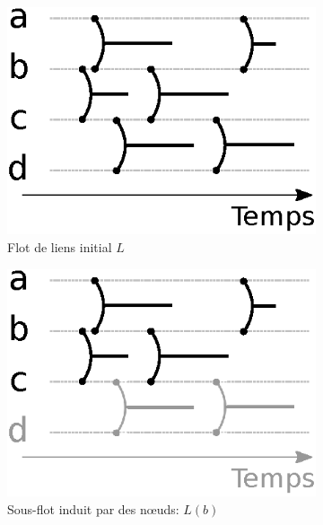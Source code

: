 \begin{figure}[]
\centering
	\begin{subfigure}{0.25\linewidth}
		\includegraphics[width=\linewidth]{img/Intro/sous_flots.eps}\hfill
		\caption{Flot de liens initial $L$}
		\label{fig:exemple_sous_flot_init}	
	\end{subfigure}\hspace{0.1\linewidth}
	\begin{subfigure}{0.25\linewidth}
		\includegraphics[width=\linewidth]{img/Intro/sous_flots1.eps}\hfill
		\caption{Sous-flot induit par des n\oe uds: $L(b)$}	
		\label{fig:exemple_sous_flot1}	
	\end{subfigure}\hspace{0.1\linewidth}
	\begin{subfigure}{0.25\linewidth}

\end{subfigure}
\end{figure}
